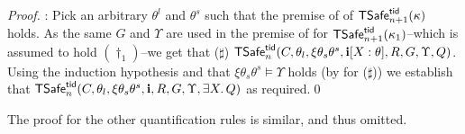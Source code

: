\begin{proof}
: 
Pick an arbitrary $\theta^l$ and $\theta^s$ such that the 
premise of  of ${\sf TSafe}^{{\sf tid}}_{n+1}(\kappa)$ holds. 
As the same $G$ and $\Upsilon$ are used in the premise of 
 for ${\sf TSafe}^{{\sf tid}}_{n+1}(\kappa_1)$--which is assumed to 
hold $(\dag_1)$--we get that ($\sharp$)
${\sf TSafe}^{{\sf tid}}_n(C,\theta_l,\xi\theta_s\theta^s,{\bf i}[X:\theta],R,G,\Upsilon, Q)$.
Using the induction hypothesis and 
that
$\xi\theta_s\theta^s\vDash\Upsilon$ holds (by  for ($\sharp$))
we establish that 
${\sf TSafe}^{{\sf tid}}_n(C,\theta_l,\xi\theta_s\theta^s,{\bf i},R,G,\Upsilon, \exists X.\,Q)$
as required.\qed
\end{proof}

The proof for the other quantification rules is similar, and thus omitted. 

%


